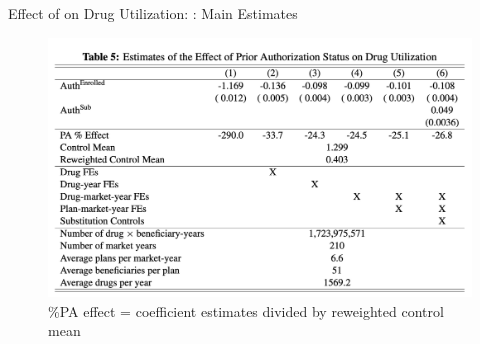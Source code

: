 \begin{frame}{Effect of on Drug Utilization: : Main Estimates}
    \begin{figure}
        \centering
        \includegraphics[width=0.7\linewidth]{tb5-2sls.png}
        \caption{\%PA effect = coefficient estimates divided by reweighted control mean}
    \end{figure}
\end{frame}